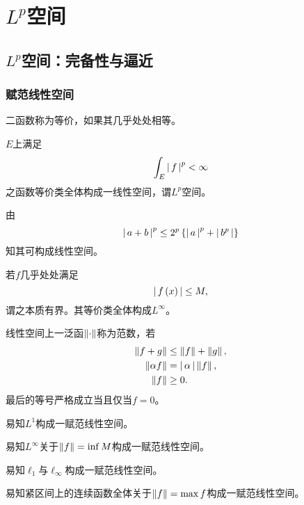 \documentclass{ctexrep}
\begin{document}
\fi


\chapter{$L^p$空间}
  \section{$L^p$空间：完备性与逼近}
  \subsection{赋范线性空间}
  \begin{definition}
    二函数称为等价，如果其几乎处处相等。
  \end{definition}
  \begin{definition}
    $E$上满足
    \[ \int_E \left|\, f \,\right|^p < \infty \]
    之函数等价类全体构成一线性空间，谓$L^p$空间。
  \end{definition}
  由
  \[ \left|\, a+b \,\right|^p \le 2^p \left\{\left|\, a \,\right|^p+\left|\, b^p \,\right|\right\} \]
  知其可构成线性空间。
  \begin{definition}
    若$f$几乎处处满足
    \[ \left|\, f\left(x\right) \,\right| \le M, \]
    谓之本质有界。其等价类全体构成$L^\infty$。
  \end{definition}
  \begin{definition}
    线性空间上一泛函$\left\| \cdot \right\|$称为范数，若
    \begin{align*}
      \left\| f+g \right\| &\le \left\| f \right\|+\left\| g \right\|,\\
      \left\| \alpha f \right\| &= \left|\, \alpha \,\right|\left\| f \right\|,\\
      \left\| f \right\| &\ge 0.
    \end{align*}
    最后的等号严格成立当且仅当$f=0$。
  \end{definition}
  \begin{ex}
    易知$L^1$构成一赋范线性空间。
  \end{ex}
  \begin{ex}
    易知$L^\infty$关于$\left\| f \right\|=\inf M$构成一赋范线性空间。
  \end{ex}
  \begin{ex}
    易知$\ell_1$与$\ell_\infty$构成一赋范线性空间。
  \end{ex}
  \begin{ex}
    易知紧区间上的连续函数全体关于$\left\| f \right\|=\max f$构成一赋范线性空间。
  \end{ex}
\end{document}
